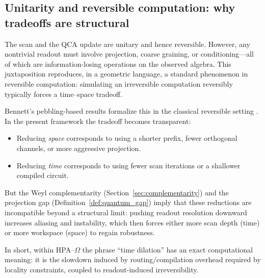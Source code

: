 \subsection{Unitarity and reversible computation: why tradeoffs are structural}
The scan and the QCA update are unitary and hence reversible.
However, any nontrivial readout must involve projection, coarse graining, or conditioning---all of which are information-losing operations on the observed algebra.
This juxtaposition reproduces, in a geometric language, a standard phenomenon in reversible computation: simulating an irreversible computation reversibly typically forces a time--space tradeoff.

Bennett's pebbling-based results formalize this in the classical reversible setting \cite{Bennett1989}. In the present framework the tradeoff becomes transparent:

\begin{itemize}
    \item Reducing \emph{space} corresponds to using a shorter prefix, fewer orthogonal channels, or more aggressive projection.
    \item Reducing \emph{time} corresponds to using fewer scan iterations or a shallower compiled circuit.
\end{itemize}

\noindent But the Weyl complementarity (Section~\ref{sec:complementarity}) and the projection gap (Definition~\ref{def:quantum_gap}) imply that these reductions are incompatible beyond a structural limit: pushing readout resolution downward increases aliasing and instability, which then forces either more scan depth (time) or more workspace (space) to regain robustness.

In short, within HPA--$\Omega$ the phrase ``time dilation'' has an exact computational meaning: it is the slowdown induced by routing/compilation overhead required by locality constraints, coupled to readout-induced irreversibility.
